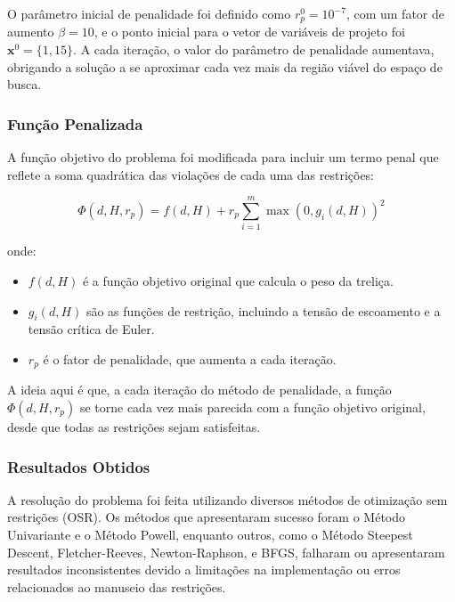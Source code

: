 \documentclass[a4paper, 12pt]{article}
\begin{document}
O parâmetro inicial de penalidade foi definido como \( r_p^0 = 10^{-7} \), com um fator de aumento \(\beta = 10\), e o ponto inicial para o vetor de variáveis de projeto foi \(\mathbf{x}^0 = \{1, 15\}\). A cada iteração, o valor do parâmetro de penalidade aumentava, obrigando a solução a se aproximar cada vez mais da região viável do espaço de busca.

\subsubsection{Função Penalizada}

A função objetivo do problema foi modificada para incluir um termo penal que reflete a soma quadrática das violações de cada uma das restrições:

\begin{equation}
    \Phi(d, H, r_p) = f(d, H) + r_p \sum_{i=1}^{m} \max(0, g_i(d, H))^2
\end{equation}

onde:
\begin{itemize}
    \item \( f(d, H) \) é a função objetivo original que calcula o peso da treliça.
    \item \( g_i(d, H) \) são as funções de restrição, incluindo a tensão de escoamento e a tensão crítica de Euler.
    \item \( r_p \) é o fator de penalidade, que aumenta a cada iteração.
\end{itemize}

A ideia aqui é que, a cada iteração do método de penalidade, a função \(\Phi(d, H, r_p)\) se torne cada vez mais parecida com a função objetivo original, desde que todas as restrições sejam satisfeitas.

\subsubsection{Resultados Obtidos}

A resolução do problema foi feita utilizando diversos métodos de otimização sem restrições (OSR). Os métodos que apresentaram sucesso foram o Método Univariante e o Método Powell, enquanto outros, como o Método Steepest Descent, Fletcher-Reeves, Newton-Raphson, e BFGS, falharam ou apresentaram resultados inconsistentes devido a limitações na implementação ou erros relacionados ao manuseio das restrições.
\end{document}
